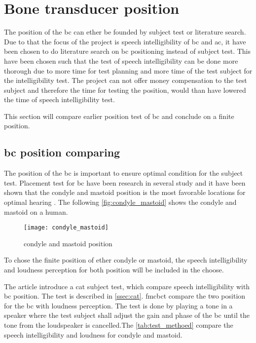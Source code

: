 \section{Bone transducer position}
\label{sec:bc_pos}

The position of the \gls{bc} can ether be founded by subject test or literature search. Due to that the focus of the project is speech intelligibility of \gls{bc} and \gls{ac}, it have been chosen to do literature search on \gls{bc} positioning instead of subject test. This have been chosen such that the test of speech intelligibility can be done more thorough due to more time for test planning and more time of the test subject for the intelligibility test. The project can not offer money compensation to the test subject and therefore the time for testing the position, would than have lowered the time of speech intelligibility test. 

This section will compare earlier position test of \gls{bc} and conclude on a finite position.

\subsection{\gls{bc} position comparing}
The position of the \gls{bc} is important to ensure optimal condition for the subject test. Placement test for \gls{bc} have been research in several study and it have been shown that the condyle and mastoid position is the most favorable locations for optimal hearing \citep{cat_test}. The following \autoref{fig:condyle_mastoid} shows the  condyle and mastoid on a human.

\begin{figure}[H]
	\centering
		\texttt{[image: condyle\_mastoid]}
		\caption{condyle and mastoid position \citep{cat_test}}
		\label{fig:condyle_mastoid}
\end{figure}

To chose the finite position of ether condyle or mastoid, the speech intelligibility and loudness perception for both position will be included in the choose. 


The article \citep{cat_test} introduce a \gls{cat} subject test, which compare  speech intelligibility with \gls{bc} position. The test is described in \autoref{ssec:cat}. \gls{fmcbct} \citep{freefield_method} compare the two position for the \gls{bc} with loudness perception. The test is done by playing a tone in a speaker where the test subject shall adjust the gain and phase of the \gls{bc} until the tone from the loudspeaker is cancelled.The \autoref{tab:test_methoed} compare the speech intelligibility and loudness for condyle and mastoid.


